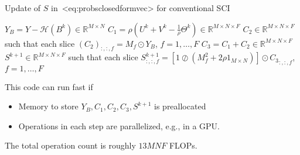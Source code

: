 \documentclass[a4paper,11pt]{article}
\def\eqref#1{<#1>}%
\begin{document}
\begin{algorithm}
  \caption{Update of $S$ in~\eqref{eq:probsclosedformvec} for
  conventional SCI}
  \label{alg:updateS}
  \begin{algorithmic}[1]
    \State $Y_B = Y - \mathcal{H}(B^k) \in \mathbb{R}^{M\times N}$
    \State $C_1 = \rho (U^k + V^k - \frac{1}{\rho}\Theta^k) \in \mathbb{R}^{M\times N\times F}$
    \State $C_2 \in \mathbb{R}^{M\times N\times F}$ such that each slice
    $(C_2)_{:, :, f} = M_f \odot Y_B$, $f = 1, \ldots, F$
    \State $C_3 = C_1 + C_2 \in \mathbb{R}^{M \times N\times F}$
    \State $S^{k+1} \in \mathbb{R}^{M\times N\times F}$ such that each slice
    $S^{k+1}_{:, :, f} = \left[1\oslash(M_f^2 + 2\rho 1_{M\times N})\right]
    \odot {C_3}_{:, :, f}$,
    $f=1, \ldots, F$
    \label{subAlg:lastStep}
  \end{algorithmic}
\end{algorithm}
This code can run fast if
\begin{itemize}
  \item Memory to store $Y_B, C_1, C_2, C_3, S^{k+1}$ is preallocated

  \item Operations in each step are parallelized, e.g., in a GPU.
\end{itemize}
The total operation count is roughly $13MNF$ FLOPs.
\end{document}
